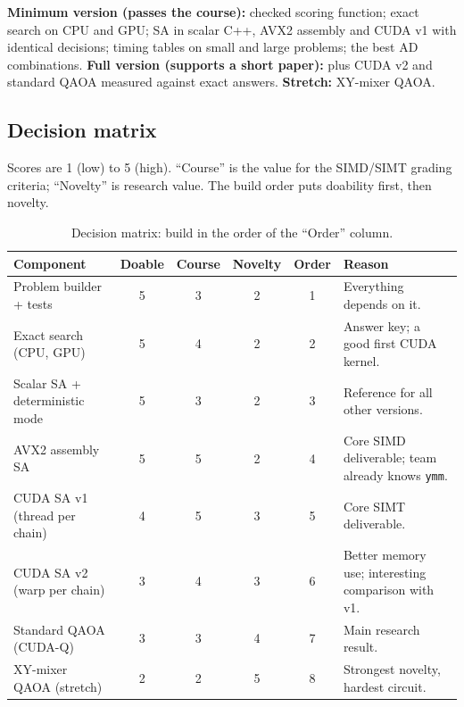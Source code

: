 \textbf{Minimum version (passes the course):} checked scoring function; exact search on CPU and GPU; SA in scalar C++, AVX2 assembly and CUDA v1 with identical decisions; timing tables on small and large problems; the best AD combinations. \textbf{Full version (supports a short paper):} plus CUDA v2 and standard QAOA measured against exact answers. \textbf{Stretch:} XY-mixer QAOA.

\subsection{Decision matrix}

Scores are 1 (low) to 5 (high). ``Course'' is the value for the SIMD/SIMT grading criteria; ``Novelty'' is research value. The build order puts doability first, then novelty.

\begin{table}[ht]
\centering
\small
\begin{tabularx}{\linewidth}{>{\raggedright\arraybackslash}Xcccc>{\raggedright\arraybackslash}p{3.4cm}}
\toprule
Component & Doable & Course & Novelty & Order & Reason \\
\midrule
Problem builder + tests & 5 & 3 & 2 & 1 & Everything depends on it. \\
Exact search (CPU, GPU) & 5 & 4 & 2 & 2 & Answer key; a good first CUDA kernel. \\
Scalar SA + deterministic mode & 5 & 3 & 2 & 3 & Reference for all other versions. \\
AVX2 assembly SA & 5 & 5 & 2 & 4 & Core SIMD deliverable; team already knows \texttt{ymm}. \\
CUDA SA v1 (thread per chain) & 4 & 5 & 3 & 5 & Core SIMT deliverable. \\
CUDA SA v2 (warp per chain) & 3 & 4 & 3 & 6 & Better memory use; interesting comparison with v1. \\
Standard QAOA (CUDA-Q) & 3 & 3 & 4 & 7 & Main research result. \\
XY-mixer QAOA (stretch) & 2 & 2 & 5 & 8 & Strongest novelty, hardest circuit. \\
\bottomrule
\end{tabularx}
\caption{Decision matrix: build in the order of the ``Order'' column.}
\label{tab:decision_matrix}
\end{table}
